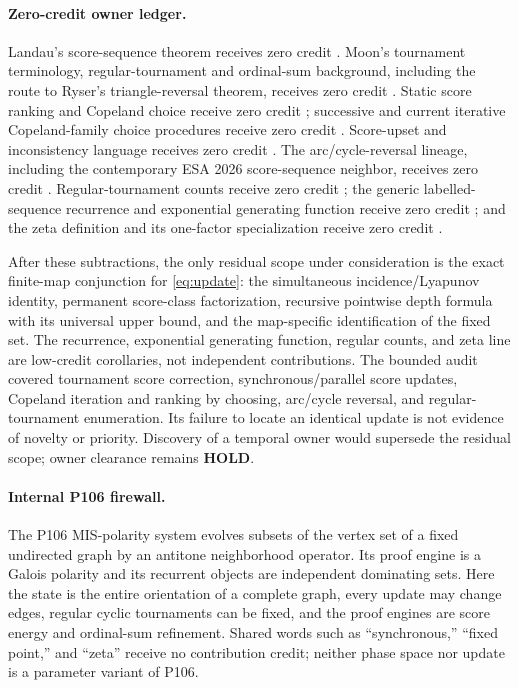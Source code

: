 \documentclass[11pt,a4paper]{amsart}
\theoremstyle{definition}
\theoremstyle{remark}
\begin{document}
\paragraph{Zero-credit owner ledger.}
Landau's score-sequence theorem receives zero credit
\cite{Landau1953}.  Moon's tournament terminology, regular-tournament and
ordinal-sum background, including the route to Ryser's triangle-reversal
theorem, receives zero credit \cite{Moon1968,Ryser1964}.  Static score
ranking and Copeland choice receive zero credit
\cite{Rubinstein1980,Henriet1985}; successive and current iterative
Copeland-family choice procedures receive zero credit
\cite{Bouyssou2004,LinaresBodanza2025}.  Score-upset and inconsistency
language receives zero credit \cite{Monsuur2005}.  The arc/cycle-reversal
lineage, including the contemporary ESA 2026 score-sequence neighbor,
receives zero credit \cite{Thomassen1988,GhoshEtAl2026}.  Regular-tournament
counts receive zero credit \cite{McKay1990}; the generic labelled-sequence
recurrence and exponential generating function receive zero credit
\cite{FlajoletSedgewick2009}; and the zeta definition and its one-factor
specialization receive zero credit \cite{ArtinMazur1965}.

After these subtractions, the only residual scope under consideration is
the exact finite-map conjunction for \eqref{eq:update}: the simultaneous
incidence/Lyapunov identity, permanent score-class factorization, recursive
pointwise depth formula with its universal upper bound, and the map-specific
identification of the fixed set.  The recurrence, exponential generating
function, regular counts, and zeta line are low-credit corollaries, not
independent contributions.  The bounded audit covered tournament score
correction, synchronous/parallel score updates, Copeland iteration and
ranking by choosing, arc/cycle reversal, and regular-tournament enumeration.
Its failure to locate an identical update is not evidence of novelty or
priority.  Discovery of a temporal owner would supersede the residual scope;
owner clearance remains \textbf{HOLD}.

\paragraph{Internal P106 firewall.}
The P106 MIS-polarity system evolves subsets of the vertex set of a fixed
undirected graph by an antitone neighborhood operator.  Its proof engine is
a Galois polarity and its recurrent objects are independent dominating
sets.  Here the state is the entire orientation of a complete graph, every
update may change edges, regular cyclic tournaments can be fixed, and the
proof engines are score energy and ordinal-sum refinement.  Shared words
such as ``synchronous,'' ``fixed point,'' and ``zeta'' receive no
contribution credit; neither phase space nor update is a parameter variant
of P106.
\end{document}
